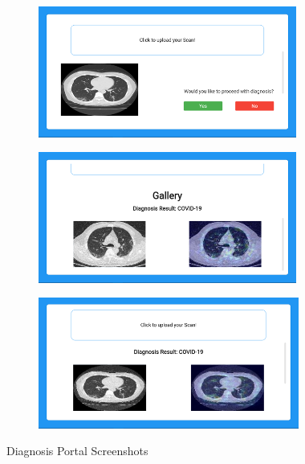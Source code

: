 \begin{figure}[H]
\begin{subfigure}[b]{0.5\textwidth}
        \end{subfigure}%
        \begin{subfigure}[b]{0.5\textwidth}
                \includegraphics[width=\linewidth, height=4.3cm]{Images/Website Screenshot 7.png}
        \end{subfigure}%
        \vspace{0.8em}
        \begin{subfigure}[b]{0.5\textwidth}
                \includegraphics[width=\linewidth, height=4.3cm]{Images/Website Screenshot 3.png}
        \end{subfigure}%
        \begin{subfigure}[b]{0.5\textwidth}
                \includegraphics[width=\linewidth, height=4.3cm]{Images/Website Screenshot 8.png}
        \end{subfigure}%
        \caption{Diagnosis Portal Screenshots}\label{fig:portalScreenshots}
\end{figure}